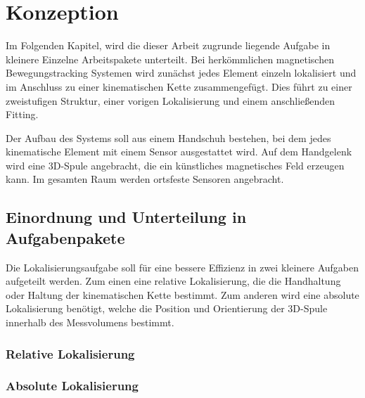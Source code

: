 \chapter{Konzeption}
\label{chap:char_konzept}
Im Folgenden Kapitel, wird die dieser Arbeit zugrunde liegende Aufgabe in kleinere Einzelne Arbeitspakete unterteilt. Bei herkömmlichen magnetischen Bewegungstracking Systemen wird zunächst jedes Element einzeln lokalisiert und im Anschluss zu einer kinematischen Kette zusammengefügt. Dies führt zu einer zweistufigen Struktur, einer vorigen Lokalisierung und einem anschließenden Fitting. 

Der Aufbau des Systems soll aus einem Handschuh bestehen, bei dem jedes kinematische Element mit einem Sensor ausgestattet wird. Auf dem Handgelenk wird eine 3D-Spule angebracht, die ein künstliches magnetisches Feld erzeugen kann. Im gesamten Raum werden ortsfeste Sensoren angebracht.

\section{Einordnung und Unterteilung in Aufgabenpakete}
\label{sec:Konzept_einteilung}
Die Lokalisierungsaufgabe soll für eine bessere Effizienz in zwei kleinere Aufgaben aufgeteilt werden. Zum einen eine relative Lokalisierung, die die Handhaltung oder Haltung der kinematischen Kette bestimmt. Zum anderen wird eine absolute Lokalisierung benötigt, welche die Position und Orientierung der 3D-Spule innerhalb des Messvolumens bestimmt.

\subsection{Relative Lokalisierung}
\label{sec:RelLoc}

\subsection{Absolute Lokalisierung}
\label{sec:AbsLoc}

		    
 
